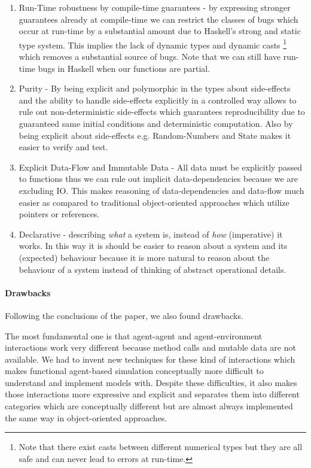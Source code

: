 \begin{enumerate}
	\item Run-Time robustness by compile-time guarantees - by expressing stronger guarantees already at compile-time we can restrict the classes of bugs which occur at run-time by a substantial amount due to Haskell's strong and static type system.  This implies the lack of dynamic types and dynamic casts \footnote{Note that there exist casts between different numerical types but they are all safe and can never lead to errors at run-time.} which removes a substantial source of bugs.  Note that we can still have run-time bugs in Haskell when our functions are partial.
	\item Purity - By being explicit and polymorphic in the types about side-effects and the ability to handle side-effects explicitly in a controlled way allows to rule out non-deterministic side-effects which guarantees reproducibility due to guaranteed same initial conditions and deterministic computation. Also by being explicit about side-effects e.g. Random-Numbers and State makes it easier to verify and test.
	\item Explicit Data-Flow and Immutable Data - All data must be explicitly passed to functions thus we can rule out implicit data-dependencies because we are excluding IO. This makes reasoning of data-dependencies and data-flow much easier as compared to traditional object-oriented approaches which utilize pointers or references.
	\item Declarative - describing \textit{what} a system is, instead of \textit{how} (imperative) it works. In this way it is should be easier to reason about a system and its (expected) behaviour because it is more natural to reason about the behaviour of a system instead of thinking of abstract operational details.
\end{enumerate}

\paragraph{Drawbacks} Following the conclusions of the paper, we also found drawbacks.

The most fundamental one is that agent-agent and agent-environment interactions work very different because method calls and mutable data are not available. We had to invent new techniques for these kind of interactions which makes functional agent-based simulation conceptually more difficult to understand and implement models with. Despite these difficulties, it also makes those interactions more expressive and explicit and separates them into different categories which are conceptually different but are almost always implemented the same way in object-oriented approaches.

